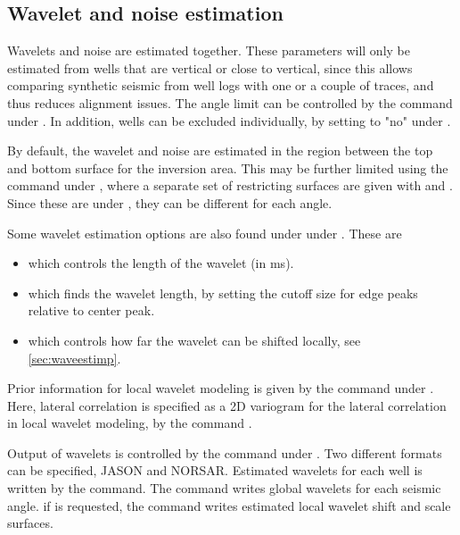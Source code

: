 \subsection{Wavelet and noise estimation}
Wavelets and noise are estimated together. These parameters will only
be estimated from wells that are vertical or close to vertical, since
this allows comparing synthetic seismic from well logs with one or a
couple of traces, and thus reduces alignment issues. The angle limit
can be controlled by the
 command
under . In addition, wells can be excluded individually,
by setting  to "no" under . 

By default, the wavelet and noise are estimated in the region between
the top and bottom surface for the inversion area. This may be further
limited using the  command under
, where a separate set of restricting surfaces are given
with  and . Since these are
under , they can be different for each angle. 

Some wavelet estimation options are also found under  under . These are
\begin{itemize}
\item {} which controls the length of the wavelet (in ms).
\item {} which finds the wavelet
  length, by setting the cutoff size for edge peaks relative to center
  peak. 
\item {} which controls how far the wavelet
  can be shifted locally, see \autoref{sec:waveestimp}. 
\end{itemize}

Prior information for local wavelet modeling is given by the  command under . Here, lateral correlation is specified as  a 2D variogram for the lateral correlation in local wavelet modeling, by the command .

Output of wavelets is controlled by the  command under . 
Two different formats can be specified, JASON and NORSAR. Estimated wavelets for each well is written by the 
 command. The command  
writes global wavelets for each seismic angle. if  is requested, the command 
 writes estimated local wavelet shift and scale surfaces.

